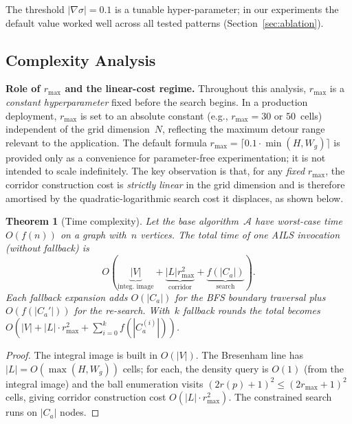 \documentclass[journal]{IEEEtran}
\newtheorem{theorem}{Theorem}
\begin{document}
\noindent
The threshold $|\nabla\sigma| = 0.1$ is a tunable hyper-parameter; in our experiments the default value worked well across all tested patterns (Section~\ref{sec:ablation}).

\subsection{Complexity Analysis}
\label{sec:complexity}

\textbf{Role of $r_{\max}$ and the linear-cost regime.}
Throughout this analysis, $r_{\max}$ is a \emph{constant hyperparameter} fixed before the search begins.
In a production deployment, $r_{\max}$ is set to an absolute constant (e.g., $r_{\max} = 30$ or $50$~cells) independent of the grid dimension~$N$, reflecting the maximum detour range relevant to the application.
The default formula $r_{\max} = \lceil 0.1 \cdot \min(H, W_g) \rceil$ is provided only as a convenience for parameter-free experimentation; it is not intended to scale indefinitely.
The key observation is that, for any \emph{fixed} $r_{\max}$, the corridor construction cost is \emph{strictly linear} in the grid dimension and is therefore amortised by the quadratic-logarithmic search cost it displaces, as shown below.

\begin{theorem}[Time complexity]\label{thm:time}
Let the base algorithm~$\mathcal{A}$ have worst-case time $O(f(n))$ on a graph with~$n$ vertices.
The total time of one AILS invocation (without fallback) is
\begin{equation}
    O\!\left(
        \underbrace{|V|}_{\text{integ.\ image}}
        + \underbrace{|L| r_{\max}^{2}}_{\text{corridor}}
        + \underbrace{f(|C_a|)}_{\text{search}}
    \right).
\end{equation}
Each fallback expansion adds $O(|C_a|)$ for the BFS boundary traversal plus $O(f(|C_a'|))$ for the re-search.
With~$k$ fallback rounds the total becomes $O(|V| + |L|\cdot r_{\max}^{2} + \sum_{i=0}^{k} f(|C_a^{(i)}|))$.
\end{theorem}

\begin{proof}
The integral image is built in $O(|V|)$.
The Bresenham line has $|L| = O(\max(H, W_g))$ cells; for each, the density query is $O(1)$ (from the integral image) and the ball enumeration visits $(2r(p)+1)^{2} \leq (2r_{\max}+1)^{2}$ cells, giving corridor construction cost $O(|L| \cdot r_{\max}^{2})$.
The constrained search runs on $|C_a|$ nodes.
\end{proof}
\end{document}
